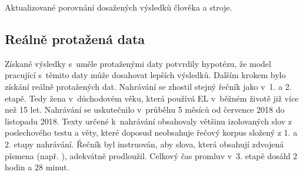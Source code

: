 \begin{table}[htpb]
  \centering
  \def\arraystretch{1.5}
  \caption{Aktualizované porovnání dosažených výsledků člověka a stroje.}
  \label{tab:realisation:augmentation:comparison}
\end{table}

\subsection{Reálně protažená data}
\label{chap:realisation:augmentation:real}

Získané výsledky s~uměle protaženými daty potvrdily hypotézu, že model pracující s~těmito daty může dosahovat lepších výsledků.
Dalším krokem bylo získání reálně protažených dat.
Nahrávání se zhostil stejný řečník jako v~1. a 2. etapě.
Tedy žena v~důchodovém věku, která používá EL v~běžném životě již více než 15 let.
Nahrávání se uskutečnilo v~průběhu 5 měsíců od července 2018 do listopadu 2018.
Texty určené k~nahrávání obsahovaly většinu izolovaných slov z poslechového testu a věty, které doposud neobsahuje řečový korpus složený z 1. a 2. etapy nahrávání.
Řečník byl instruován, aby slova, která obsahují zdvojená písmena (např. ), adekvátně prodloužil.
Celkový čas promluv v~3. etapě dosáhl $2$ hodin a $28$ minut.

